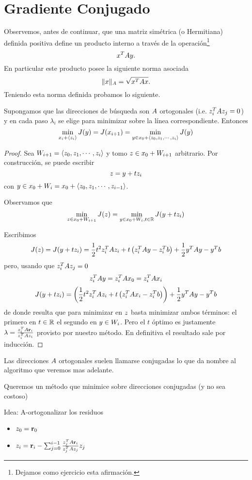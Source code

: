 \section{Gradiente Conjugado}
Observemos, antes de continuar, que una matriz simétrica (o Hermitiana) definida positiva define un producto interno a través de la operación\footnote{Dejamos como ejercicio esta afirmación.}
$$
\xb^T\Ab\yb.
$$
En particular este producto posee la siguiente norma asociada 
$$
\|\xb\|_A=\sqrt{\xb^T\Ab\xb}.
$$
Teniendo esta norma definida probamos lo siguiente.
\tcc
\begin{lema}
Supongamos que las direcciones de búsqueda son $\Ab$ ortogonales (i.e. $\zb_i^T\Ab\zb_j=0$) y en cada paso $\lambda_i$ se elige para minimizar sobre la línea correspondiente. Entonces
$$
\min_{\xb_i+\langle \zb_i\rangle}J(\yb)=J(\xb_{i+1})=\min_{\yb\in \xb_0+\langle \zb_0,\zb_1,\cdots,\zb_i \rangle} J(\yb)
$$
\end{lema}
\etcc
\begin{proof}
 Sea $W_{i+1}=\langle \zb_0,\zb_1,\cdots,\zb_i \rangle$ y tomo $\zb\in \xb_0+W_{i+1}$ arbitrario. Por construcción, se puede escribir 
 $$\zb=\yb+t\zb_i$$ con $\yb\in \xb_0+ W_i=\xb_0+\langle \zb_0,\zb_1,\cdots,\zb_{i-1} \rangle$. 
 
Observamos que  
  $$
 \min_{\zb\in \xb_0+W_{i+1}}J(\zb)=\min_{\yb\in\xb_0+W_{i},t \in \R} J(\yb+t \zb_i) 
 $$
 
Escribimos 
$$
J(z)=J(\yb+t\zb_i)=\frac{1}{2}t^2\zb_i^T\Ab\zb_i+t\left(\zb_i^T\Ab\yb-\zb_i^T\bb\right) +\frac{1}{2}\yb^T\Ab\yb-\yb^T\bb
$$
pero, usando que $\zb_i^T\Ab\zb_j=0$ 
$$
\zb_i^T\Ab\yb=\zb_i^T\Ab\xb_0=\zb_i^T\Ab\xb_i
$$
$$
J(\yb+t\zb_i)=\left(\frac{1}{2}t^2\zb_i^T\Ab\zb_i+t\left(\zb_i^T\Ab\xb_i-\zb_i^T\bb\right)\right) +\frac{1}{2}\yb^T\Ab\yb-\yb^T\bb
$$
de donde resulta que 
para minimizar en $\zb$ basta minimizar ambos términos: el primero en $t\in \mathbb R$ el segundo en $\yb\in W_i$. Pero el $t$ óptimo es justamente $\lambda=\frac{\zb_i^T\Ab\rb_i}{\zb_i^T\Ab\zb_i}$ provisto por nuestro método. En definitiva
  el resultado sale por inducción.
\end{proof}

\tccdefi
\begin{center}Las direcciones $\Ab$ ortogonales suelen llamarse conjugadas lo que da nombre al algoritmo que veremos mas adelante.
\end{center}
\etcc
Queremos un método que minimice sobre direcciones conjugadas (y no sea costoso)

Idea: A-ortogonalizar los residuos
\begin{itemize}
 \item $\zb_0=\rb_0$
 \item $\zb_i=\rb_i-\sum_{j=0}^{i-1}\frac{\zb_j^T\Ab\rb_i}{\zb_j^T\Ab\zb_j}\zb_j$
\end{itemize}
 


